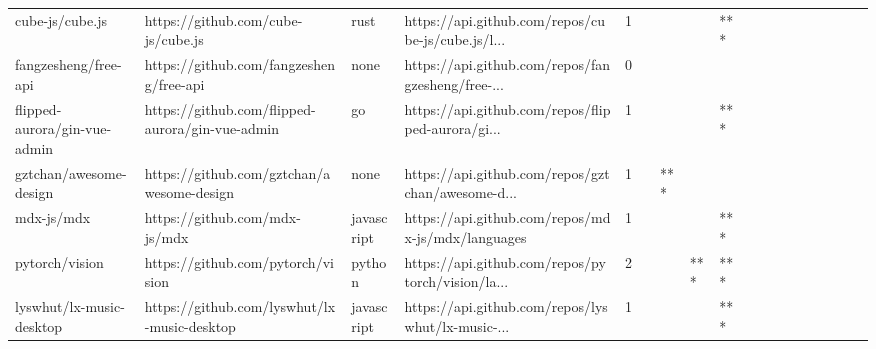 \begin{tabular}{llllrlllllllllllll}
cube-js/cube.js                                    &                 https://github.com/cube-js/cube.js &              rust &  https://api.github.com/repos/cube-js/cube.js/l... &       1 &         &        &           &            *** &                 &        &           &           &          &          &       &              &          \\
fangzesheng/free-api                               &            https://github.com/fangzesheng/free-api &              none &  https://api.github.com/repos/fangzesheng/free-... &       0 &         &        &           &                &                 &        &           &           &          &          &       &              &          \\
flipped-aurora/gin-vue-admin                       &    https://github.com/flipped-aurora/gin-vue-admin &                go &  https://api.github.com/repos/flipped-aurora/gi... &       1 &         &        &           &            *** &                 &        &           &           &          &          &       &              &          \\
gztchan/awesome-design                             &          https://github.com/gztchan/awesome-design &              none &  https://api.github.com/repos/gztchan/awesome-d... &       1 &         &    *** &           &                &                 &        &           &           &          &          &       &              &          \\
mdx-js/mdx                                         &                      https://github.com/mdx-js/mdx &        javascript &  https://api.github.com/repos/mdx-js/mdx/languages &       1 &         &        &           &            *** &                 &        &           &           &          &          &       &              &          \\
pytorch/vision                                     &                  https://github.com/pytorch/vision &            python &  https://api.github.com/repos/pytorch/vision/la... &       2 &         &        &       *** &            *** &                 &        &           &           &          &          &       &              &          \\
lyswhut/lx-music-desktop                           &        https://github.com/lyswhut/lx-music-desktop &        javascript &  https://api.github.com/repos/lyswhut/lx-music-... &       1 &         &        &           &            *** &                 &        &           &           &          &          &       &              &          \\

\end{tabular}
